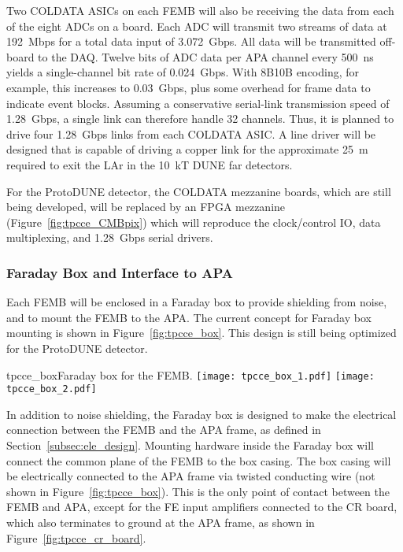 Two COLDATA ASICs on each FEMB will also be receiving the data from each of the eight ADCs on a board.
Each ADC will transmit two streams of data at 192~Mbps for a total data input of 3.072~Gbps.
All data will be transmitted off-board to the DAQ.
Twelve bits of ADC data per APA channel every 500~ns yields a single-channel bit rate of 0.024~Gbps.
With 8B10B encoding, for example, this increases to 0.03~Gbps, plus some overhead for frame 
data to indicate event blocks.
Assuming a conservative serial-link transmission speed of 1.28~Gbps, 
a single link can therefore handle 32 channels.
Thus, it is planned to drive four 1.28~Gbps links from each COLDATA ASIC.
A line driver will be designed that is capable of driving a copper link for the approximate 25~m required
to exit the LAr in the 10~kT DUNE far detectors.

For the ProtoDUNE detector, the COLDATA mezzanine boards, which are still being developed, will be
replaced by an FPGA mezzanine (Figure~\ref{fig:tpcce_CMBpix}) 
which will reproduce the clock/control IO, data multiplexing, and 1.28~Gbps serial drivers.

%
\subsubsection{Faraday Box and Interface to APA}
\label{subsubsec:ce_faraday_box}

Each FEMB will be enclosed in a Faraday box to provide shielding from noise, and to mount the FEMB 
to the APA. The current concept for Faraday box mounting is shown in Figure~\ref{fig:tpcce_box}. This
design is still being optimized for the ProtoDUNE detector.

\begin{cdrfigure}{tpcce_box}{Faraday box for the FEMB.}
\texttt{[image: tpcce\_box\_1.pdf]}
\texttt{[image: tpcce\_box\_2.pdf]}
\end{cdrfigure}

In addition to noise shielding, the Faraday box is designed to make the electrical connection 
between the FEMB and the APA frame, as defined in Section~\ref{subsec:ele_design}. Mounting 
hardware inside the Faraday box will connect the common plane of the FEMB to the box casing. The
box casing will be electrically connected to the APA frame via twisted conducting wire (not 
shown in Figure~\ref{fig:tpcce_box}). This is the only point of contact between the FEMB and
APA, except for the FE input amplifiers connected to the CR board, which also terminates to
ground at the APA frame, as shown in Figure~\ref{fig:tpcce_cr_board}.

